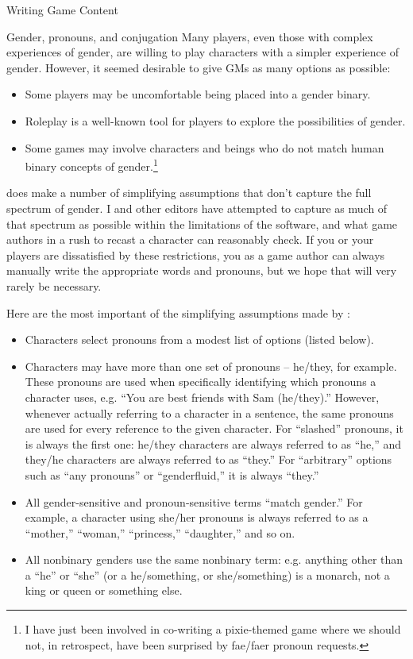 \documentclass[sheet]{GameTexBase}
\begin{document}
\begin{section}{Writing Game Content}
\begin{subsection}{Gender, pronouns, and conjugation}
Many players, even those with complex experiences of gender, are willing to play characters with a simpler experience of gender.  However, it seemed desirable to give GMs as many options as possible:
\begin{itemize}
\item Some players may be uncomfortable being placed into a gender binary.
\item Roleplay is a well-known tool for players to explore the possibilities of gender.
\item Some games may involve characters and beings who do not match human binary concepts of gender.\footnote{I have just been involved in co-writing a pixie-themed game where we should not, in retrospect, have been surprised by fae/faer pronoun requests.}
\end{itemize}

\gametex{} does make a number of simplifying assumptions that don't capture the full spectrum of gender.  I and other \gametex{} editors have attempted to capture as much of that spectrum as possible within the limitations of the software, and what game authors in a rush to recast a character can reasonably check.  If you or your players are dissatisfied by these restrictions, you as a game author can always manually write the appropriate words and pronouns, but we hope that will very rarely be necessary.

Here are the most important of the simplifying assumptions made by \gametex{}:

\begin{itemize}
\item Characters select pronouns from a modest list of options (listed below).
\item Characters may have more than one set of pronouns -- he/they, for example.  These pronouns are used when specifically identifying which pronouns a character uses, e.g. ``You are best friends with Sam (he/they).'' However, whenever actually referring to a character in a sentence, the same pronouns are used for every reference to the given character.  For ``slashed'' pronouns, it is always the first one: he/they characters are always referred to as ``he,'' and they/he characters are always referred to as ``they.''  For ``arbitrary'' options such as ``any pronouns'' or ``genderfluid,'' it is always ``they.''
\item All gender-sensitive and pronoun-sensitive terms ``match gender.''  For example, a character using she/her pronouns is always referred to as a ``mother,'' ``woman,'' ``princess,'' ``daughter,'' and so on.
\item All nonbinary genders use the same nonbinary term: e.g. anything other than a ``he'' or ``she'' (or a he/something, or she/something) is a monarch, not a king or queen or something else.
\end{itemize}


\end{subsection}
\end{section}
\end{document}
